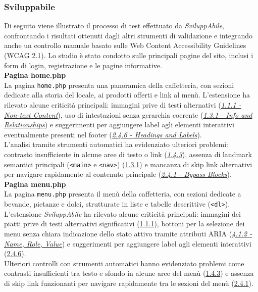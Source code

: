 \subsubsection{Sviluppabile}
\noindent Di seguito viene illustrato il processo di test effettuato da \textit{SviluppAbile}, confrontando i risultati ottenuti dagli altri strumenti di validazione e integrando anche un controllo manuale basato sulle Web Content Accessibility Guidelines (WCAG 2.1). Lo studio è stato condotto sulle principali pagine del sito, inclusi i form di login, registrazione e le pagine informative.\\

\noindent \textbf{Pagina home.php}\\
La pagina \texttt{home.php} presenta una panoramica della caffetteria, con sezioni dedicate alla storia del locale, ai prodotti offerti e link al menù. L’estensione ha rilevato alcune criticità principali: immagini prive di testi alternativi ({\hyperref[wcag:1.1.1]{\textit{1.1.1 - Non-text Content}}}), uso di intestazioni senza gerarchia coerente ({\hyperref[wcag:1.3.1]{\textit{1.3.1 - Info and Relationships}}}) e suggerimenti per aggiungere label agli elementi interattivi eventualmente presenti nel footer ({\hyperref[wcag:2.4.6]{\textit{2.4.6 - Headings and Labels}}}).\\
L’analisi tramite strumenti automatici ha evidenziato ulteriori problemi: contrasto insufficiente in alcune aree di testo o link ({\hyperref[wcag:1.4.3]{\textit{1.4.3}}}), assenza di landmark semantici principali (\texttt{<main>} e \texttt{<nav>}) ({\hyperref[wcag:1.3.1]{1.3.1}}) e mancanza di skip link alternativi per navigare rapidamente al contenuto principale ({\hyperref[wcag:2.4.1]{\textit{2.4.1 - Bypass Blocks}}}).\\

\noindent \textbf{Pagina menu.php}\\
La pagina \texttt{menu.php} presenta il menù della caffetteria, con sezioni dedicate a bevande, pietanze e dolci, strutturate in liste e tabelle descrittive (\texttt{<dl>}). 
L’estensione \textit{SviluppAbile} ha rilevato alcune criticità principali: immagini dei piatti prive di testi alternativi significativi ({\hyperref[wcag:1.1.1]{1.1.1}}), bottoni per la selezione dei menu senza chiara indicazione dello stato attivo tramite attributi ARIA ({\hyperref[wcag:4.1.2]{\textit{4.1.2 - Name, Role, Value}}}) e suggerimenti per aggiungere label agli elementi interattivi ({\hyperref[wcag:2.4.6]{2.4.6}}).\\
Ulteriori controlli con strumenti automatici hanno evidenziato problemi come contrasti insufficienti tra testo e sfondo in alcune aree del menù ({\hyperref[wcag:1.4.3]{1.4.3}}) e assenza di skip link funzionanti per navigare rapidamente tra le sezioni del menù ({\hyperref[wcag:2.4.1]{2.4.1}}).\\

